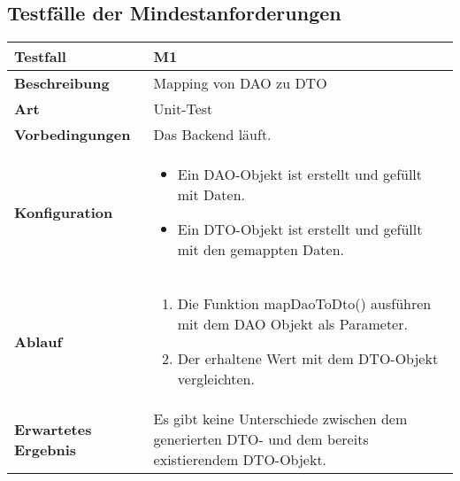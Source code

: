 \subsection{Testfälle der Mindestanforderungen}

\begin{longtable}{p{}|p{}}
	\hline
	\textbf{Testfall}               & \textbf{M1} \\
	\hline
	\textbf{Beschreibung}   		& Mapping von DAO zu DTO \\
	\hline
	\textbf{Art}    				& Unit-Test \\
	\hline
	\textbf{Vorbedingungen}    		& Das Backend läuft. \\
	\hline
	\textbf{Konfiguration}   	 	& 
	\begin{itemize}
		\item Ein DAO-Objekt ist erstellt und gefüllt mit Daten.
		\item Ein DTO-Objekt ist erstellt und gefüllt mit den gemappten Daten.
	\end{itemize} \\
	\hline
	\textbf{Ablauf}    				& 
	\begin{enumerate}
		\item Die Funktion mapDaoToDto() ausführen mit dem DAO Objekt als Parameter.
		\item Der erhaltene Wert mit dem DTO-Objekt vergleichten.
	\end{enumerate} \\
	\hline
	\textbf{Erwartetes Ergebnis}    & Es gibt keine Unterschiede zwischen dem generierten DTO- und dem bereits existierendem DTO-Objekt. \\
	\hline
\end{longtable}\label{tab:testfall-M1}

